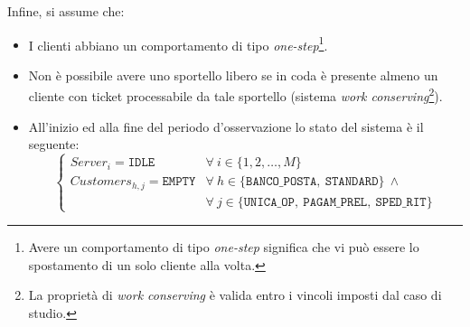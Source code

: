 Infine, si assume che:
\begin{itemize}
\item I clienti abbiano un comportamento di tipo \textsl{one-step}\footnote{Avere un comportamento di tipo \textsl{one-step} significa che vi può essere lo spostamento di un solo cliente alla volta.}.
\item Non è possibile avere uno sportello libero se in coda è presente almeno un cliente con ticket processabile da tale sportello (sistema \textsl{work conserving}\footnote{La proprietà di \textsl{work conserving} è valida entro i vincoli imposti dal caso di studio.}).
\item All'inizio ed alla fine del periodo d'osservazione lo stato del sistema è il seguente:
\begin{equation}
\begin{cases}
Server_i =\mathtt{IDLE} & \forall\ i \in \lbrace 1, 2, \dots, M \rbrace \\[1em]
Customers_{h,j} = \mathtt{EMPTY} & \forall\ h \in \lbrace \mathtt{BANCO\_POSTA},\ \mathtt{STANDARD}\rbrace\ \wedge \\
& \forall\ j \in \lbrace \mathtt{UNICA\_OP},\ \mathtt{PAGAM\_PREL},\ \mathtt{SPED\_RIT} \rbrace
\end{cases}
\end{equation}
\end{itemize}


